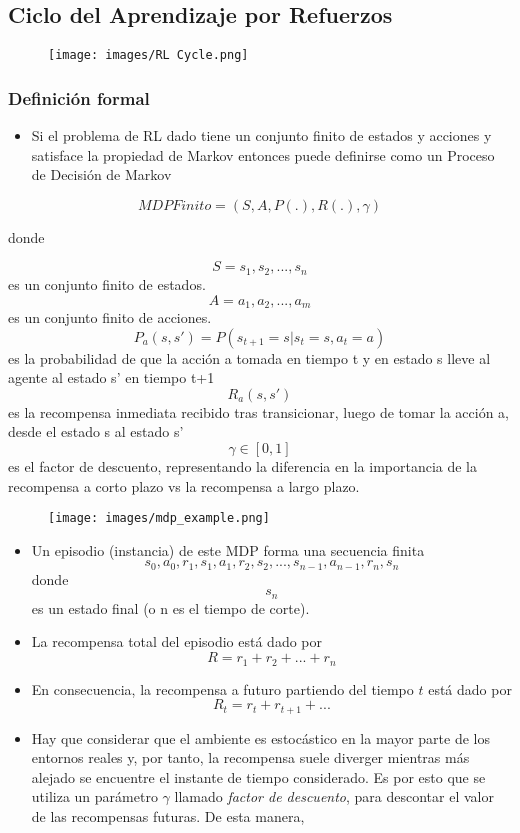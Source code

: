 \documentclass[11pt]{article}
\makeatletter
\def\maxwidth{\ifdim\Gin@nat@width>\linewidth\linewidth
    \else\Gin@nat@width\fi}
\let\Oldincludegraphics\includegraphics
\renewcommand{\includegraphics}[1]{\Oldincludegraphics[width=.8\maxwidth]{#1}}
\providecommand{\tightlist}{%
      \setlength{\itemsep}{0pt}\setlength{\parskip}{0pt}}
\makeatother
\begin{document}
\subsection{Ciclo del Aprendizaje por
Refuerzos}\label{ciclo-del-aprendizaje-por-refuerzos}

\begin{figure}
\centering
\texttt{[image: images/RL Cycle.png]}
\caption{}
\end{figure}

    \subsubsection{Definición formal}\label{definiciuxf3n-formal}

\begin{itemize}
\tightlist
\item
  Si el problema de RL dado tiene un conjunto finito de estados y
  acciones y satisface la propiedad de Markov entonces puede definirse
  como un Proceso de Decisión de Markov
\end{itemize}

\begin{equation}
MDPFinito = (S, A, P(.), R(.), γ)
\end{equation}

donde

\[ S = {s_{1}, s_{2}, ..., s_{n}} \] es un conjunto finito de estados.
\[ A = {a_{1}, a_{2}, ..., a_{m}} \] es un conjunto finito de acciones.
\[ P_{a}(s,s') = P(s_{t+1} = s | s_{t} = s, a_{t} = a) \] es la
probabilidad de que la acción a tomada en tiempo t y en estado s lleve
al agente al estado s' en tiempo t+1 \[ R_{a}(s,s') \] es la recompensa
inmediata recibido tras transicionar, luego de tomar la acción a, desde
el estado s al estado s' \[\gamma \in  [0,1]\] es el factor de
descuento, representando la diferencia en la importancia de la
recompensa a corto plazo vs la recompensa a largo plazo.

    \begin{figure}
\centering
\texttt{[image: images/mdp\_example.png]}
\caption{}
\end{figure}

    \begin{itemize}
\item
  Un episodio (instancia) de este MDP forma una secuencia finita
  \[s_{0}, a_{0}, r_{1}, s_{1}, a_{1}, r_{2}, s_{2}, ... , s_{n-1}, a_{n-1}, r_{n}, s_{n} \]
  donde \[s_{n}\] es un estado final (o n es el tiempo de corte).
\item
  La recompensa total del episodio está dado por
  \[ R = r_{1} + r_{2} + ... + r_{n} \]
\item
  En consecuencia, la recompensa a futuro partiendo del tiempo \(t\)
  está dado por \[R_{t} = r_{t} + r_{t+1} + ... \]
\item
  Hay que considerar que el ambiente es estocástico en la mayor parte de
  los entornos reales y, por tanto, la recompensa suele diverger
  mientras más alejado se encuentre el instante de tiempo considerado.
  Es por esto que se utiliza un parámetro \(γ\) llamado \emph{factor de
  descuento}, para descontar el valor de las recompensas futuras. De
  esta manera,
\end{itemize}
\end{document}
